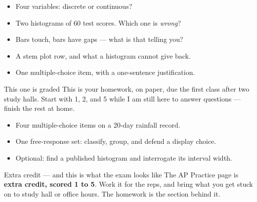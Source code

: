 \documentclass[aspectratio=169, 11pt]{beamer}
\begin{document}
\begin{frame}[t, plain]
  \begin{itemize}\setlength{\itemsep}{5pt}
    \item Four variables: discrete or continuous?
    \item Two histograms of 60 test scores. Which one is \emph{wrong}?
    \item Bars touch, bars have gaps --- what is that telling you?
    \item A stem plot row, and what a histogram cannot give back.
    \item One multiple-choice item, with a one-sentence justification.
  \end{itemize}
  \begin{block}{This one is graded}
    This is your  homework, on paper, due the first class after two study halls. Start with 1, 2, and 5
    while I am still here to answer questions --- finish the rest at home.
  \end{block}
\end{frame}

\begin{frame}[t, plain]
  \begin{itemize}\setlength{\itemsep}{5pt}
    \item Four multiple-choice items on a 20-day rainfall record.
    \item One free-response set: classify, group, and defend a display choice.
    \item Optional: find a published histogram and interrogate its interval width.
  \end{itemize}
  \begin{block}{Extra credit --- and this is what the exam looks like}
    The AP Practice page is \textbf{extra credit, scored 1 to 5}. Work it for the reps, and bring what you
    get stuck on to study hall or office hours. The  homework is the section
    behind it.
  \end{block}
\end{frame}
\end{document}
